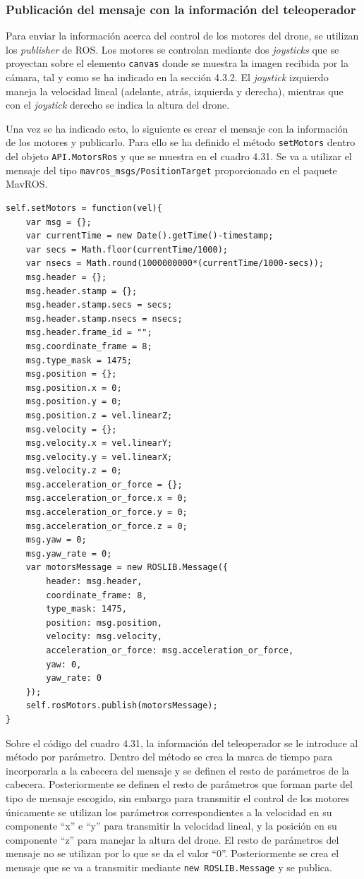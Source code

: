 \subsubsection{Publicación del mensaje con la información del teleoperador}

Para enviar la información acerca del control de los motores del drone, se utilizan los \textit{publisher} de ROS. Los motores se controlan mediante dos \textit{joysticks} que se proyectan sobre el elemento \texttt{canvas} donde se muestra la imagen recibida por la cámara, tal y como se ha indicado en la sección 4.3.2. El \textit{joystick} izquierdo maneja la velocidad lineal (adelante, atrás, izquierda y derecha), mientras que con el \textit{joystick} derecho se indica la altura del drone.

Una vez se ha indicado esto, lo siguiente es crear el mensaje con la información de los motores y publicarlo. Para ello se ha definido el método \texttt{setMotors} dentro del objeto \texttt{API.MotorsRos} y que se muestra en el cuadro 4.31. Se va a utilizar el mensaje del tipo \texttt{mavros\_msgs/PositionTarget} proporcionado en el paquete MavROS.

\begin{lstlisting}[caption= Publicar el mensaje con la información del teleoperador, label=cod.publishetmotors]
self.setMotors = function(vel){
	var msg = {};
	var currentTime = new Date().getTime()-timestamp;
	var secs = Math.floor(currentTime/1000);
	var nsecs = Math.round(1000000000*(currentTime/1000-secs));
	msg.header = {};
	msg.header.stamp = {};
	msg.header.stamp.secs = secs;
	msg.header.stamp.nsecs = nsecs;
	msg.header.frame_id = "";
	msg.coordinate_frame = 8;
	msg.type_mask = 1475;
	msg.position = {};
	msg.position.x = 0;
	msg.position.y = 0;
	msg.position.z = vel.linearZ;
	msg.velocity = {};
	msg.velocity.x = vel.linearY;
	msg.velocity.y = vel.linearX;
	msg.velocity.z = 0;
	msg.acceleration_or_force = {};
	msg.acceleration_or_force.x = 0;
	msg.acceleration_or_force.y = 0;
	msg.acceleration_or_force.z = 0;
	msg.yaw = 0;
	msg.yaw_rate = 0;
	var motorsMessage = new ROSLIB.Message({
		header: msg.header,
		coordinate_frame: 8,
		type_mask: 1475,
		position: msg.position,
		velocity: msg.velocity,
		acceleration_or_force: msg.acceleration_or_force,
		yaw: 0,
		yaw_rate: 0
	});
	self.rosMotors.publish(motorsMessage);
}
\end{lstlisting}

Sobre el código del cuadro 4.31, la información del teleoperador se le introduce al método por parámetro. Dentro del método se crea la marca de tiempo para incorporarla a la cabecera del mensaje y se definen el resto de parámetros de la cabecera. Posteriormente se definen el resto de parámetros que forman parte del tipo de mensaje escogido, sin embargo para transmitir el control de los motores únicamente se utilizan los parámetros correspondientes a la velocidad en su componente ``x'' e ``y'' para transmitir la velocidad lineal, y la posición en su componente ``z'' para manejar la altura del drone. El resto de parámetros del mensaje no se utilizan por lo que se da el valor ``0''. Posteriormente se crea el mensaje que se va a transmitir mediante \texttt{new ROSLIB.Message} y se publica.

